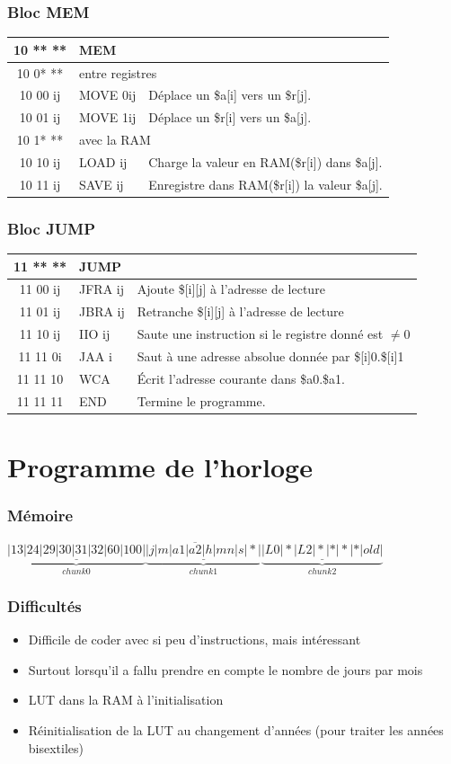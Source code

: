 \documentclass{beamer}
\begin{document}
	\begin{frame}
\frametitle{Bloc MEM}
\begin{tabular}{|c|l|l|}
\hline\hline
  10 ** ** & \multicolumn{2}{|l|}{MEM} \\
  \hline
  10 0* ** & \multicolumn{2}{|l|}{entre registres} \\
  \hline
  10 00 ij & MOVE 0ij & Déplace un \$a[i] vers un \$r[j]. \\
  10 01 ij & MOVE 1ij & Déplace un \$r[i] vers un \$a[j]. \\
  \hline
  10 1* ** & \multicolumn{2}{|l|}{avec la RAM} \\
  \hline
  10 10 ij & LOAD ij  & Charge la valeur en RAM(\$r[i]) dans \$a[j]. \\
  10 11 ij & SAVE ij  & Enregistre dans RAM(\$r[i]) la valeur \$a[j]. \\
\end{tabular}
\end{frame} 

\begin{frame}
\frametitle{Bloc JUMP}
\begin{tabular}{|c|l|l|}
  \hline\hline
  11 ** ** & \multicolumn{2}{|l|}{JUMP} \\
  \hline
  11 00 ij & JFRA ij & Ajoute \$[i][j] à l'adresse de lecture \\
  11 01 ij & JBRA ij & Retranche \$[i][j] à l'adresse de lecture \\
  11 10 ij & IIO  ij & Saute une instruction si le registre donné est $\neq 0$ \\
  11 11 0i & JAA  i  & Saut à une adresse absolue donnée par \$[i]0.\$[i]1\\
  11 11 10 & WCA     & \'Ecrit l'adresse courante dans \$a0.\$a1. \\
  11 11 11 & END      & Termine le programme. \\
  \hline
	\end{tabular}
\end{frame} 

\section{Programme de l'horloge}


\begin{frame}
\frametitle{Mémoire}
$\overline{\underbrace{\underline{|13|24|29|30|31|32|60|100|}}_{chunk 0}\underbrace{\underline{|j|m|a1|a2|h|mn|s|*|}}_{chunk 1}\underbrace{\underline{|L0|*|L2|*|*|*|*|old|}}_{chunk 2}}$
\end{frame} 


\begin{frame}
\frametitle{Difficultés}
\begin{itemize}
	\item Difficile de coder avec si peu d'instructions, mais intéressant
	\item Surtout lorsqu'il a fallu prendre en compte le nombre de jours par mois
	\item LUT dans la RAM à l'initialisation
	\item Réinitialisation de la LUT au changement d'années (pour traiter les années bisextiles)
	\end{itemize}
	\end{frame} 
	
\end{document}
